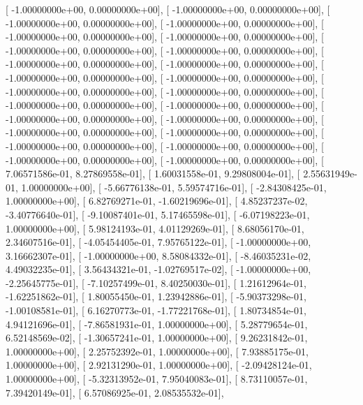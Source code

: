 \documentclass{article}
\begin{document}
       [ -1.00000000e+00,   0.00000000e+00],
       [ -1.00000000e+00,   0.00000000e+00],
       [ -1.00000000e+00,   0.00000000e+00],
       [ -1.00000000e+00,   0.00000000e+00],
       [ -1.00000000e+00,   0.00000000e+00],
       [ -1.00000000e+00,   0.00000000e+00],
       [ -1.00000000e+00,   0.00000000e+00],
       [ -1.00000000e+00,   0.00000000e+00],
       [ -1.00000000e+00,   0.00000000e+00],
       [ -1.00000000e+00,   0.00000000e+00],
       [ -1.00000000e+00,   0.00000000e+00],
       [ -1.00000000e+00,   0.00000000e+00],
       [ -1.00000000e+00,   0.00000000e+00],
       [ -1.00000000e+00,   0.00000000e+00],
       [ -1.00000000e+00,   0.00000000e+00],
       [ -1.00000000e+00,   0.00000000e+00],
       [ -1.00000000e+00,   0.00000000e+00],
       [ -1.00000000e+00,   0.00000000e+00],
       [ -1.00000000e+00,   0.00000000e+00],
       [ -1.00000000e+00,   0.00000000e+00],
       [ -1.00000000e+00,   0.00000000e+00],
       [ -1.00000000e+00,   0.00000000e+00],
       [ -1.00000000e+00,   0.00000000e+00],
       [ -1.00000000e+00,   0.00000000e+00],
       [  7.06571586e-01,   8.27869558e-01],
       [  1.60031558e-01,   9.29808004e-01],
       [  2.55631949e-01,   1.00000000e+00],
       [ -5.66776138e-01,   5.59574716e-01],
       [ -2.84308425e-01,   1.00000000e+00],
       [  6.82769271e-01,  -1.60219696e-01],
       [  4.85237237e-02,  -3.40776640e-01],
       [ -9.10087401e-01,   5.17465598e-01],
       [ -6.07198223e-01,   1.00000000e+00],
       [  5.98124193e-01,   4.01129269e-01],
       [  8.68056170e-01,   2.34607516e-01],
       [ -4.05454405e-01,   7.95765122e-01],
       [ -1.00000000e+00,   3.16662307e-01],
       [ -1.00000000e+00,   8.58084332e-01],
       [ -8.46035231e-02,   4.49032235e-01],
       [  3.56434321e-01,  -1.02769517e-02],
       [ -1.00000000e+00,  -2.25645775e-01],
       [ -7.10257499e-01,   8.40250030e-01],
       [  1.21612964e-01,  -1.62251862e-01],
       [  1.80055450e-01,   1.23942886e-01],
       [ -5.90373298e-01,  -1.00108581e-01],
       [  6.16270773e-01,  -1.77221768e-01],
       [  1.80734854e-01,   4.94121696e-01],
       [ -7.86581931e-01,   1.00000000e+00],
       [  5.28779654e-01,   6.52148569e-02],
       [ -1.30657241e-01,   1.00000000e+00],
       [  9.26231842e-01,   1.00000000e+00],
       [  2.25752392e-01,   1.00000000e+00],
       [  7.93885175e-01,   1.00000000e+00],
       [  2.92131290e-01,   1.00000000e+00],
       [ -2.09428124e-01,   1.00000000e+00],
       [ -5.32313952e-01,   7.95040083e-01],
       [  8.73110057e-01,   7.39420149e-01],
       [  6.57086925e-01,   2.08535532e-01],
\end{document}
